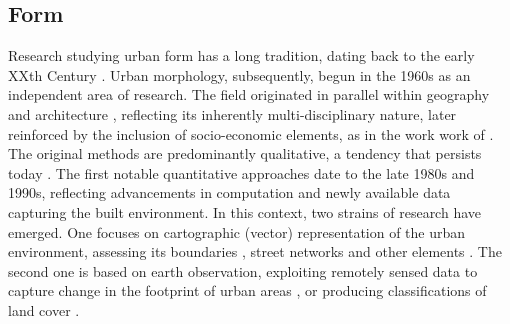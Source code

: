 \subsection{Form}
\label{sec:lit_form}

Research studying urban form has a long tradition, dating back to the early
XXth Century \citep{geddes1915cities,
trewartha1934japanese}. Urban morphology, subsequently, begun in the 1960s as an independent area of
research. The field originated in parallel within
geography \citep{conzen1960alnwick} and architecture
\citep{muratori1959studi}, reflecting its inherently multi-disciplinary
nature, later reinforced by the inclusion of socio-economic
elements, as in the work work of \cite{panerai1997formes}. The original methods are
predominantly qualitative, a tendency that persists today \citep{dibble2016urban}.
The first notable quantitative approaches date to the late 1980s and 1990s,
reflecting advancements in computation and newly available data capturing the
built environment. In this context, two strains of research have emerged. One
focuses on cartographic (vector) representation of the urban environment, assessing its
boundaries \citep{batty1987}, street networks \citep{hillier1996, porta2006}
and other elements \citep{pivo1993taxonomy}. The second one is based on earth
observation, exploiting remotely sensed data to capture change in the
footprint of urban areas \citep{howarth1983landsat}, or producing
classifications of land cover \citep{europeanenvironmentagency1990}. 

